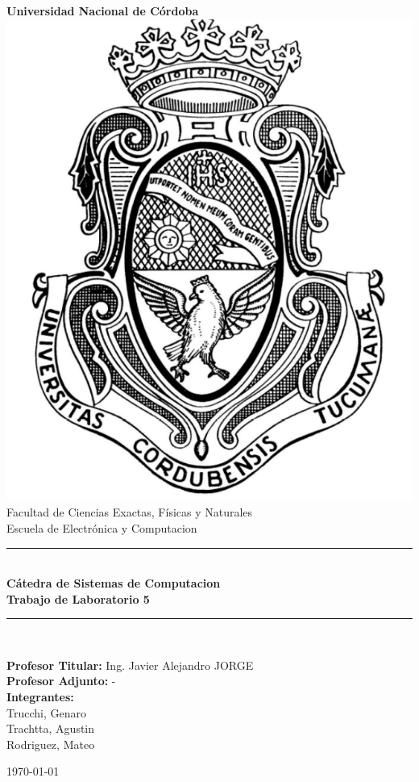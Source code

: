 \begin{titlepage}
    \begin{center}
        {\LARGE \textbf{Universidad Nacional de Córdoba}}\\[1.5cm]

        \includegraphics[scale=0.4]{img/logo2.png}\\[1.5cm]

        {\large Facultad de Ciencias Exactas, Físicas y Naturales}\\
        {\large Escuela de Electrónica y Computacion}\\[1cm]

        \rule{\linewidth}{0.5mm}\\[0.4cm]
        {\Large \textbf{Cátedra de Sistemas de Computacion}}\\[0.3cm]
        {\LARGE \textbf{Trabajo de Laboratorio 5}}\\[0.3cm]
        \rule{\linewidth}{0.5mm}\\[1cm]

        \begin{flushleft}
        {\large 
            \textbf{Profesor Titular:} Ing. Javier Alejandro JORGE\\
            \textbf{Profesor Adjunto:} -\\[0.5cm]
            \textbf{Integrantes:}\\
            Trucchi, Genaro\\
            Trachtta, Agustin\\
            Rodriguez, Mateo\\
        }
        \end{flushleft}

        \vfill

        {\large \today}
    \end{center}
\end{titlepage}
